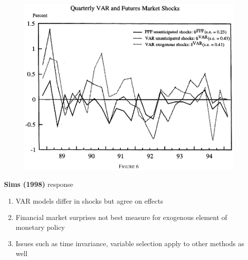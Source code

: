 \documentclass{beamer}
\begin{document}
\begin{frame}
  \begin{figure}
    \includegraphics[scale=.7]{rudebusch.eps}
  \end{figure}
\end{frame}

\begin{frame}
  \textbf{Sims (1998)} response
  \begin{enumerate}
    \item VAR models differ in shocks but agree on effects
    \item Financial market surprises not best measure for exogenous element of monetary policy
    \item Issues such as time invariance, variable selection apply to other methods as well
  \end{enumerate}
\end{frame}
\end{document}
